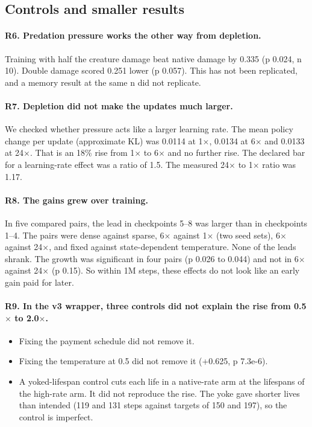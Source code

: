 \documentclass[11pt]{article}
\begin{document}
\subsection{Controls and smaller results}

\paragraph{R6. Predation pressure works the other way from depletion.}
Training with half the creature damage beat native damage by 0.335 (p 0.024, n 10). Double damage scored 0.251 lower (p 0.057). This has not been replicated, and a memory result at the same n did not replicate.

\paragraph{R7. Depletion did not make the updates much larger.}
We checked whether pressure acts like a larger learning rate. The mean policy change per update (approximate KL) was 0.0114 at 1$\times$, 0.0134 at 6$\times$ and 0.0133 at 24$\times$. That is an 18\% rise from 1$\times$ to 6$\times$ and no further rise. The declared bar for a learning-rate effect was a ratio of 1.5. The measured 24$\times$ to 1$\times$ ratio was 1.17.

\paragraph{R8. The gains grew over training.}
In five compared pairs, the lead in checkpoints 5--8 was larger than in checkpoints 1--4. The pairs were dense against sparse, 6$\times$ against 1$\times$ (two seed sets), 6$\times$ against 24$\times$, and fixed against state-dependent temperature. None of the leads shrank. The growth was significant in four pairs (p 0.026 to 0.044) and not in 6$\times$ against 24$\times$ (p 0.15). So within 1M steps, these effects do not look like an early gain paid for later.

\paragraph{R9. In the v3 wrapper, three controls did not explain the rise from 0.5$\times$ to 2.0$\times$.}

\begin{itemize}
\item Fixing the payment schedule did not remove it.
\item Fixing the temperature at 0.5 did not remove it (+0.625, p 7.3e-6).
\item A yoked-lifespan control cuts each life in a native-rate arm at the lifespans of the high-rate arm. It did not reproduce the rise. The yoke gave shorter lives than intended (119 and 131 steps against targets of 150 and 197), so the control is imperfect.
\end{itemize}
\end{document}
